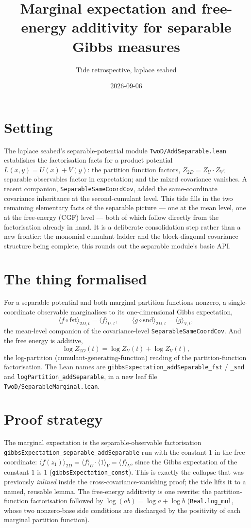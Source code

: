 \documentclass[11pt]{article}
\title{Marginal expectation and free-energy additivity for separable Gibbs measures}
\author{Tide retrospective, laplace seabed}
\date{2026-09-06}
\begin{document}
\sloppy
\maketitle

\section{Setting}
The laplace seabed's separable-potential module \texttt{TwoD/AddSeparable.lean} establishes the
factorisation facts for a product potential $L(x,y) = U(x)+V(y)$: the partition function factors,
$Z_{2D} = Z_U\cdot Z_V$; separable observables factor in expectation; and the mixed covariance
vanishes. A recent companion, \texttt{SeparableSameCoordCov}, added the same-coordinate covariance
inheritance at the second-cumulant level. This tide fills in the two remaining elementary facts of
the separable picture --- one at the mean level, one at the free-energy (CGF) level --- both of which
follow directly from the factorisation already in hand. It is a deliberate consolidation step rather
than a new frontier: the monomial cumulant ladder and the block-diagonal covariance structure being
complete, this rounds out the separable module's basic API.

\section{The thing formalised}
For a separable potential and both marginal partition functions nonzero, a single-coordinate
observable marginalises to its one-dimensional Gibbs expectation,
\[
  \langle f\circ\mathrm{fst}\rangle_{2D,t} = \langle f\rangle_{U,t},\qquad
  \langle g\circ\mathrm{snd}\rangle_{2D,t} = \langle g\rangle_{V,t},
\]
the mean-level companion of the covariance-level \texttt{SeparableSameCoordCov}. And the free energy
is additive,
\[
  \log Z_{2D}(t) = \log Z_U(t) + \log Z_V(t),
\]
the log-partition (cumulant-generating-function) reading of the partition-function factorisation. The
Lean names are \texttt{gibbsExpectation\_addSeparable\_fst} / \texttt{\_snd} and
\texttt{logPartition\_addSeparable}, in a new leaf file \texttt{TwoD/SeparableMarginal.lean}.

\section{Proof strategy}
The marginal expectation is the separable-observable factorisation
\texttt{gibbsExpectation\_separable\_addSeparable} run with the constant $1$ in the free coordinate:
$\langle f(z_1)\rangle_{2D} = \langle f\rangle_U\cdot\langle 1\rangle_V = \langle f\rangle_U$, since
the Gibbs expectation of the constant $1$ is $1$ (\texttt{gibbsExpectation\_const}). This is exactly
the collapse that was previously \emph{inlined} inside the cross-covariance-vanishing proof; the tide
lifts it to a named, reusable lemma. The free-energy additivity is one rewrite: the partition-function
factorisation followed by $\log(ab) = \log a + \log b$ (\texttt{Real.log\_mul}, whose two nonzero-base
side conditions are discharged by the positivity of each marginal partition function).
\end{document}
